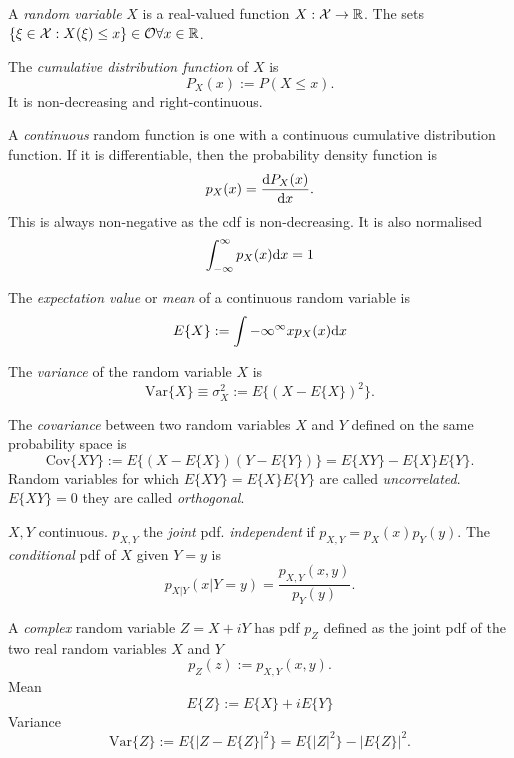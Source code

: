 A \textit{random variable} $X$ is a real-valued function $X:\mathcal{X} \rightarrow \mathbb{R}$. The sets $\{ \xi \in \mathcal{X} : X(\xi) \leq x \} \in \mathcal{O} \forall x \in \mathbb{R}$.

The \textit{cumulative distribution function} of $X$ is 
\begin{equation}
\label{eq:cdf}
P_X(x) := P(X\leq x).
\end{equation} 
It is non-decreasing and right-continuous.

A \textit{continuous} random function is one with a continuous cumulative distribution function. If it is differentiable, then the probability density  function is 
\begin{equation}
\label{eq:pdf}
p_X(x)=\frac{{\mbox{d}} P_X(x)}{{\mbox{d}} x}.
\end{equation}
This is always non-negative as the cdf is non-decreasing. It is also normalised 
\begin{equation}
\label{eq:pdfNormalised}
\int_{-\infty}^{\infty} p_X(x) {\mbox{d}} x =1
\end{equation}

The \textit{expectation value} or \textit{mean} of a continuous random variable is 
\begin{equation}
\label{eq:expectation}
E\{X\} := \int {-\infty}^{\infty} x p_X(x) {\mbox{d}} x
\end{equation}

The \textit{variance} of the random variable $X$ is 
\begin{equation}
\mbox{Var} \{ X \} \equiv \sigma^2_X := E\{(X-E\{X\})^2\}.
\end{equation}

The \textit{covariance} between two random variables $X$ and $Y$ defined on the same probability space is 
\begin{equation}
\mbox{Cov}\{XY\} := E\{(X-E\{X\})(Y-E\{Y\})\} = E\{XY\}-E\{X\}E\{Y\}.
\end{equation}
Random variables for which $E\{XY\}=E\{X\}E\{Y\}$ are called \textit{uncorrelated}. $E\{XY\}=0$ they are called \textit{orthogonal}.

$X,Y$ continuous. $p_{X,Y}$ the \textit{joint} pdf. \textit{independent} if $p_{X,Y}=p_X(x)p_Y(y)$. The \textit{conditional} pdf of $X$ given $Y=y$ is 
\begin{equation}
p_{X|Y}(x|Y=y)=\frac{p_{X,Y}(x,y)}{p_Y(y)}.
\end{equation}

A \textit{complex} random variable $Z=X+iY$ has pdf $p_Z$ defined as the joint pdf of the two real random variables $X$ and $Y$
\begin{equation}
p_Z(z):=p_{X,Y}(x,y).
\end{equation}
Mean
\begin{equation}
E\{Z\} := E\{X\}+ iE\{Y\}
\end{equation}
Variance 
\begin{equation}
\mbox{Var}\{Z\} := E\{ | Z - E\{Z\} |^2 \} = E\{|Z|^2\}-|E\{Z\}|^2.
\end{equation}

